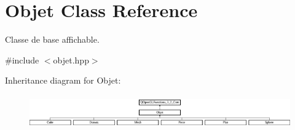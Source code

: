 \hypertarget{class_objet}{\section{Objet Class Reference}
\label{class_objet}
}


Classe de base affichable.  




{\ttfamily \#include $<$objet.\+hpp$>$}

Inheritance diagram for Objet\+:\begin{figure}[H]
\begin{center}
\leavevmode
\includegraphics[height=1.435897cm]{class_objet}
\end{center}
\end{figure}
